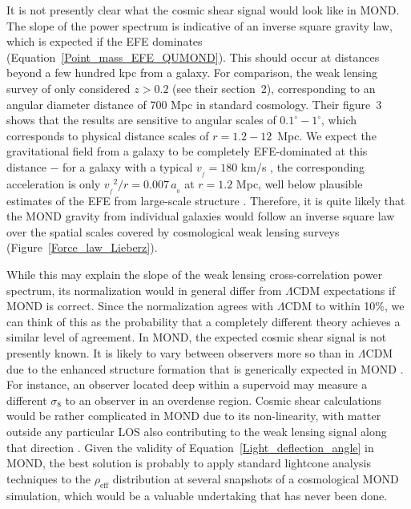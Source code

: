 \documentclass[fleqn,usenatbib,useAMS,onecolumn]{mnras} %
\begin{document}
It is not presently clear what the cosmic shear signal would look like in MOND. The slope of the power spectrum is indicative of an inverse square gravity law, which is expected if the EFE dominates (Equation~\ref{Point_mass_EFE_QUMOND}). This should occur at distances beyond a few hundred kpc from a galaxy. For comparison, the weak lensing survey of \citet{DES_2018} only considered $z > 0.2$ (see their section~2), corresponding to an angular diameter distance of 700 Mpc in standard cosmology. Their figure~3 shows that the results are sensitive to angular scales of $0.1^\circ - 1^\circ$, which corresponds to physical distance scales of $r = 1.2 - 12$~Mpc. We expect the gravitational field from a galaxy to be completely EFE-dominated at this distance $-$ for a galaxy with a typical $v_{_f} = 180$ km/s \citep{Kafle_2012}, the corresponding acceleration is only ${v_{_f}}^2/r = 0.007 \, a_{_0}$ at $r = 1.2$ Mpc, well below plausible estimates of the EFE from large-scale structure \citep[e.g.][]{Famaey_2007, Banik_Ryan_2018, Chae_2020_EFE, Chae_2021, Haslbauer_2020}. Therefore, it is quite likely that the MOND gravity from individual galaxies would follow an inverse square law over the spatial scales covered by cosmological weak lensing surveys (Figure~\ref{Force_law_Lieberz}).

While this may explain the slope of the weak lensing cross-correlation power spectrum, its normalization would in general differ from $\Lambda$CDM expectations if MOND is correct. Since the normalization agrees with $\Lambda$CDM to within 10\%, we can think of this as the probability that a completely different theory achieves a similar level of agreement. In MOND, the expected cosmic shear signal is not presently known. It is likely to vary between observers more so than in $\Lambda$CDM due to the enhanced structure formation that is generically expected in MOND \citep[e.g.][]{Sanders_2001, Angus_2013, Haslbauer_2020}. For instance, an observer located deep within a supervoid may measure a different $\sigma_8$ to an observer in an overdense region. Cosmic shear calculations would be rather complicated in MOND due to its non-linearity, with matter outside any particular LOS also contributing to the weak lensing signal along that direction \citep{Feix_2008}. Given the validity of Equation~\ref{Light_deflection_angle} in MOND, the best solution is probably to apply standard lightcone analysis techniques to the $\rho_{\text{eff}}$ distribution at several snapshots of a cosmological MOND simulation, which would be a valuable undertaking that has never been done.
\end{document}
